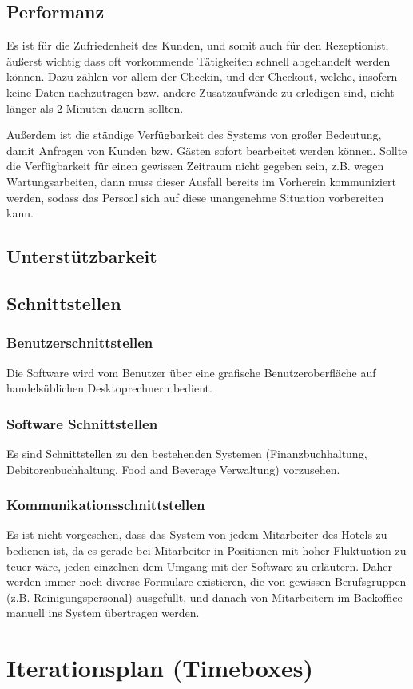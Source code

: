 \documentclass[10pt,a4paper,titlepage]{article}
\begin{document}
\subsection{Performanz}
Es ist für die Zufriedenheit des Kunden, und somit auch für den \Gls{Rezeptionist}, äußerst wichtig dass oft vorkommende Tätigkeiten schnell abgehandelt werden können. Dazu zählen vor allem der \Gls{Checkin}, und der \Gls{Checkout}, welche, insofern keine Daten nachzutragen bzw. andere Zusatzaufwände zu erledigen sind, nicht länger als 2 Minuten dauern sollten.

Außerdem ist die ständige Verfügbarkeit des Systems von großer Bedeutung, damit Anfragen von Kunden bzw. Gästen sofort bearbeitet werden können. Sollte die Verfügbarkeit für einen gewissen Zeitraum nicht gegeben sein, z.B. wegen Wartungsarbeiten, dann muss dieser Ausfall bereits im Vorherein kommuniziert werden, sodass das Persoal sich auf diese unangenehme Situation vorbereiten kann.
\subsection{Unterstützbarkeit}
\subsection{Schnittstellen}
\subsubsection{Benutzerschnittstellen}
Die Software wird vom Benutzer über eine grafische Benutzeroberfläche auf handelsüblichen Desktoprechnern bedient.
\subsubsection{Software Schnittstellen}
Es sind Schnittstellen zu den bestehenden Systemen (Finanzbuchhaltung, Debitorenbuchhaltung, Food and Beverage Verwaltung) vorzusehen.
\subsubsection{Kommunikationsschnittstellen}
Es ist nicht vorgesehen, dass das System von jedem Mitarbeiter des Hotels zu bedienen ist, da es gerade bei Mitarbeiter in Positionen mit hoher Fluktuation zu teuer wäre, jeden einzelnen dem Umgang mit der Software zu erläutern. Daher werden immer noch diverse Formulare existieren, die von gewissen Berufsgruppen (z.B. Reinigungspersonal) ausgefüllt, und danach von Mitarbeitern im Backoffice manuell ins System übertragen werden.

\newpage

\section{Iterationsplan (Timeboxes)}

\newpage

\printglossary[title=Glossar,toctitle=GLOSSAR]
\end{document}
